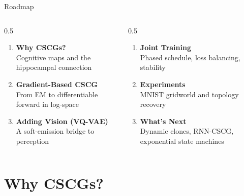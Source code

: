 \documentclass[aspectratio=169,10pt]{beamer}
\begin{document}
\begin{frame}{Roadmap}
  \vspace{0.4em}
  \begin{columns}[T,onlytextwidth]
    \begin{column}{0.5\textwidth}
      \begin{enumerate}\setlength\itemsep{0.55em}
        \item[\textbf{I.}] \textbf{Why CSCGs?} \\
              \small\color{mutedgray}Cognitive maps and the hippocampal connection
        \item[\textbf{II.}] \textbf{Gradient-Based CSCG}\\
              \small\color{mutedgray}From EM to differentiable forward in log-space
        \item[\textbf{III.}] \textbf{Adding Vision (VQ-VAE)}\\
              \small\color{mutedgray}A soft-emission bridge to perception
      \end{enumerate}
    \end{column}
    \begin{column}{0.5\textwidth}
      \begin{enumerate}\setlength\itemsep{0.55em}
        \item[\textbf{IV.}] \textbf{Joint Training}\\
              \small\color{mutedgray}Phased schedule, loss balancing, stability
        \item[\textbf{V.}] \textbf{Experiments}\\
              \small\color{mutedgray}MNIST gridworld and topology recovery
        \item[\textbf{VI.}] \textbf{What's Next}\\
              \small\color{mutedgray}Dynamic clones, RNN-CSCG, exponential state machines
      \end{enumerate}
    \end{column}
  \end{columns}
\end{frame}

\section{Why CSCGs?}
\end{document}
